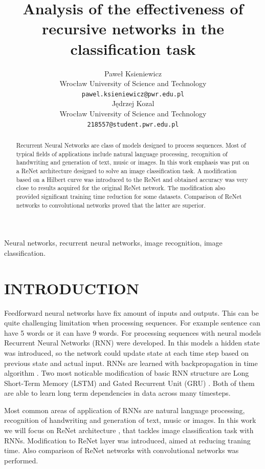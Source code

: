 \documentclass[a4paper, 10 pt, journal]{ieeeconf}
\title{\LARGE \bf
Analysis of the effectiveness of recursive
networks in the classification task
}
\author{\parbox{2 in}{\centering Paweł Ksieniewicz \\
        Wrocław University of Science and Technology\\
        {\tt\small pawel.ksieniewicz@pwr.edu.pl}}
        \hspace*{ 0.3 in}
        \parbox{2 in}{\centering Jędrzej Kozal \\
        Wrocław University of Science and Technology\\
        {\tt\small 218557@student.pwr.edu.pl}}
}
\begin{document}
\maketitle
\thispagestyle{empty}
\pagestyle{empty}

\begin{abstract}

Recurrent Neural Networks are class of models designed to process sequences. Most of typical fields of applications include natural language processing, recognition of handwriting and generation of text, music or images. In this work emphasis was put on a ReNet architecture designed to solve an image classification task. A modification based on a Hilbert curve was introduced to the ReNet and obtained accuracy was very close to results acquired for the original ReNet network. The modification also provided significant training time reduction for some datasets. Comparison of ReNet networks to convolutional networks proved that the latter are superior.

\end{abstract}

\begin{keywords}
Neural networks, recurrent neural networks, image recognition, image classification.
\end{keywords}

\section{INTRODUCTION}

Feedforward neural networks have fix amount of inputs and outputs. This can be quite challenging limitation when processing sequences. For example sentence can have 5 words or it can have 9 words. For processing sequences with neural models Recurrent Neural Networks (RNN) \cite{RNN} were developed. In this models a hidden state was introduced, so the network could update state at each time step based on previous state and actual input. RNNs are learned with backpropagation in time algorithm \cite{BPTT}. Two most noticable modification of basic RNN structure are Long Short-Term Memory (LSTM) \cite{LSTM} and Gated Recurrent Unit (GRU) \cite{DBLP:journals/corr/ChoMGBSB14}. Both of them are able to learn long term dependencies in data across many timesteps.

Most common areas of application of RNNs are natural language processing, recognition of handwriting and generation of text, music or images. In this work we will focus on ReNet architecture \cite{DBLP:journals/corr/VisinKCMCB15}, that tackles image classification task with RNNs. Modification to ReNet layer was introduced, aimed at reducing traning time. Also comparison of ReNet networks with convolutional networks was performed.
\end{document}
